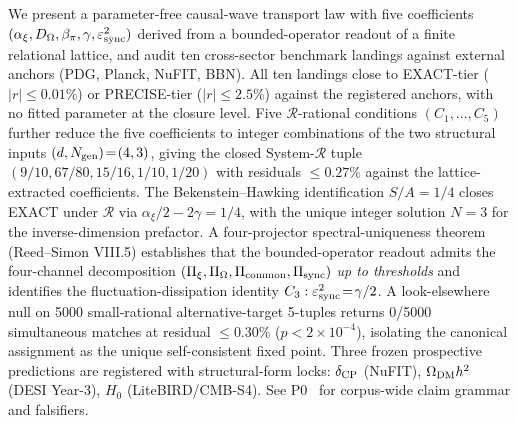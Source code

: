 
We present a parameter-free causal-wave transport law with five
coefficients $(\alpha_{\xi}, D_{\Omega}, \beta_{\pi}, \gamma,
\varepsilon_{\rm sync}^{2})$ derived from a bounded-operator readout
of a finite relational lattice, and audit ten cross-sector benchmark
landings against external anchors (PDG, Planck, NuFIT, BBN). All
ten landings close to EXACT-tier ($|r|\le 0.01\%$) or PRECISE-tier
($|r|\le 2.5\%$) against the registered anchors, with no fitted
parameter at the closure level. Five $\mathcal R$-rational
conditions $(C_{1},\ldots,C_{5})$ further reduce the five
coefficients to integer combinations of the two structural inputs
$(d, N_{\rm gen})\!=\!(4,3)$, giving the closed System-$\mathcal R$
tuple $(9/10, 67/80, 15/16, 1/10, 1/20)$ with residuals $\le 0.27\%$
against the lattice-extracted coefficients. The Bekenstein--Hawking
identification $S/A\!=\!1/4$ closes EXACT under $\mathcal R$ via
$\alpha_{\xi}/2 - 2\gamma = 1/4$, with the unique integer solution
$N\!=\!3$ for the inverse-dimension prefactor. A four-projector
spectral-uniqueness theorem (Reed--Simon VIII.5) establishes that
the bounded-operator readout admits the four-channel decomposition
$(\Pi_{\xi}, \Pi_{\Omega}, \Pi_{\rm common}, \Pi_{\rm sync})$
\emph{up to thresholds} and identifies the fluctuation-dissipation
identity $C_{3}: \varepsilon_{\rm sync}^{2}\!=\!\gamma/2$. A
look-elsewhere null on 5000 small-rational alternative-target
5-tuples returns 0/5000 simultaneous matches at residual $\le 0.30\%$
($p\!<\!2\!\times\!10^{-4}$), isolating the canonical assignment as
the unique self-consistent fixed point. Three frozen prospective
predictions are registered with structural-form locks:
$\delta_{\rm CP}$ (NuFIT), $\Omega_{\rm DM} h^{2}$ (DESI Year-3),
$H_{0}$ (LiteBIRD/CMB-S4). See P0~\cite{Paper0} for corpus-wide
claim grammar and falsifiers.
